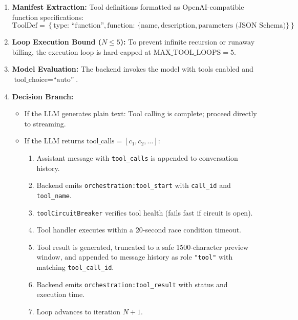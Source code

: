 \documentclass[10pt,a4paper]{article}
\begin{document}
\begin{interviewplaybook}
\begin{enumerate}[leftmargin=*]
    \item \textbf{Manifest Extraction:} Tool definitions formatted as OpenAI-compatible function specifications:
    \begin{equation*}
        \text{ToolDef} = \left\{ \text{type: ``function''}, \text{function: } \{ \text{name}, \text{description}, \text{parameters (JSON Schema)} \} \right\}
    \end{equation*}
    \item \textbf{Loop Execution Bound ($N \le 5$):} To prevent infinite recursion or runaway billing, the execution loop is hard-capped at $\text{MAX\_TOOL\_LOOPS} = 5$.
    \item \textbf{Model Evaluation:} The backend invokes the model with tools enabled and $\text{tool\_choice} = \text{``auto''}$.
    \item \textbf{Decision Branch:}
    \begin{itemize}
        \item If the LLM generates plain text: Tool calling is complete; proceed directly to streaming.
        \item If the LLM returns $\text{tool\_calls} = [c_1, c_2, \dots]$:
        \begin{enumerate}
            \item Assistant message with \texttt{tool\_calls} is appended to conversation history.
            \item Backend emits \texttt{orchestration:tool\_start} with \texttt{call\_id} and \texttt{tool\_name}.
            \item \texttt{toolCircuitBreaker} verifies tool health (fails fast if circuit is open).
            \item Tool handler executes within a 20-second race condition timeout.
            \item Tool result is generated, truncated to a safe 1500-character preview window, and appended to message history as role \texttt{"tool"} with matching \texttt{tool\_call\_id}.
            \item Backend emits \texttt{orchestration:tool\_result} with status and execution time.
            \item Loop advances to iteration $N+1$.
        \end{enumerate}
    \end{itemize}
\end{enumerate}
\end{interviewplaybook}
\end{document}
